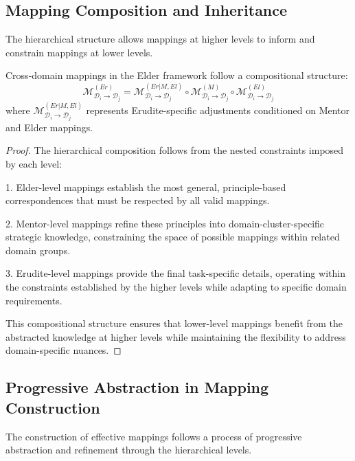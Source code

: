 \subsection{Mapping Composition and Inheritance}

The hierarchical structure allows mappings at higher levels to inform and constrain mappings at lower levels.

\begin{theorem}
Cross-domain mappings in the Elder framework follow a compositional structure:
\begin{equation}
\mathcal{M}^{(Er)}_{\mathcal{D}_i \rightarrow \mathcal{D}_j} = \mathcal{M}^{(Er|M,El)}_{\mathcal{D}_i \rightarrow \mathcal{D}_j} \circ \mathcal{M}^{(M)}_{\mathcal{D}_i \rightarrow \mathcal{D}_j} \circ \mathcal{M}^{(El)}_{\mathcal{D}_i \rightarrow \mathcal{D}_j}
\end{equation}
where $\mathcal{M}^{(Er|M,El)}_{\mathcal{D}_i \rightarrow \mathcal{D}_j}$ represents Erudite-specific adjustments conditioned on Mentor and Elder mappings.
\end{theorem}

\begin{proof}
The hierarchical composition follows from the nested constraints imposed by each level:

1. Elder-level mappings establish the most general, principle-based correspondences that must be respected by all valid mappings.

2. Mentor-level mappings refine these principles into domain-cluster-specific strategic knowledge, constraining the space of possible mappings within related domain groups.

3. Erudite-level mappings provide the final task-specific details, operating within the constraints established by the higher levels while adapting to specific domain requirements.

This compositional structure ensures that lower-level mappings benefit from the abstracted knowledge at higher levels while maintaining the flexibility to address domain-specific nuances.
\end{proof}

\subsection{Progressive Abstraction in Mapping Construction}

The construction of effective mappings follows a process of progressive abstraction and refinement through the hierarchical levels.

